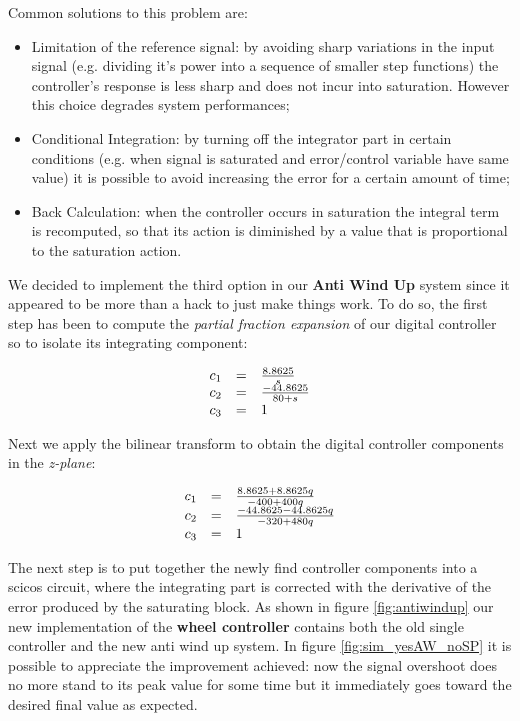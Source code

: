 Common solutions to this problem are:
\begin{itemize}
\item Limitation of the reference signal: by avoiding sharp variations in the input signal (e.g. dividing it's power into a sequence of smaller step functions) the controller's response is less sharp and does not incur into saturation. However this choice degrades system performances;
\item Conditional Integration: by turning off the integrator part in certain conditions (e.g. when signal is saturated and error/control variable have same value) it is possible to avoid increasing the error for a certain amount of time;
\item Back Calculation: when the controller occurs in saturation the integral term is recomputed, so that its action is diminished by a value that is proportional to the saturation action. 
\end{itemize}

We decided to implement the third option in our \textbf{Anti Wind Up} system since it appeared to be more than a hack to just make things work. To do so, the first step has been to compute the \textit{partial fraction expansion} of our digital controller so to isolate its integrating component:

\[
\begin{array}{lcl}
c_1 & = & {8.8625} \over {s} \\
c_2 & = & {-44.8625} \over {80 + s} \\
c_3 & = & 1
\end{array}
\]

Next we apply the bilinear transform to obtain the digital controller components in the \textit{z-plane}:

\[
\begin{array}{lcl}
c_1 & = & {8.8625 + 8.8625q} \over {- 400 + 400q} \\
c_2 & = & {- 44.8625 - 44.8625q} \over {- 320 + 480q} \\
c_3 & = & 1
\end{array}
\]

The next step is to put together the newly find controller components into a scicos circuit, where the integrating part is corrected with the derivative of the error produced by the saturating block. As shown in figure \ref{fig:antiwindup} our new implementation of the \textbf{wheel controller} contains both the old single controller and the new anti wind up system. In figure \ref{fig:sim_yesAW_noSP} it is possible to appreciate the improvement achieved: now the signal overshoot does no more stand to its peak value for some time but it immediately goes toward the desired final value as expected.

